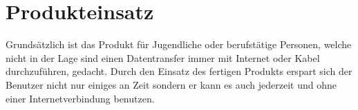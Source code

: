\section{Produkteinsatz}
Grundsätzlich ist das Produkt für Jugendliche oder berufstätige Personen, welche nicht in der Lage sind einen Datentransfer immer mit Internet oder Kabel durchzuführen, gedacht. Durch den Einsatz des fertigen Produkts erspart sich der Benutzer nicht nur einiges an Zeit sondern er kann es auch jederzeit und ohne einer Internetverbindung benutzen.\\